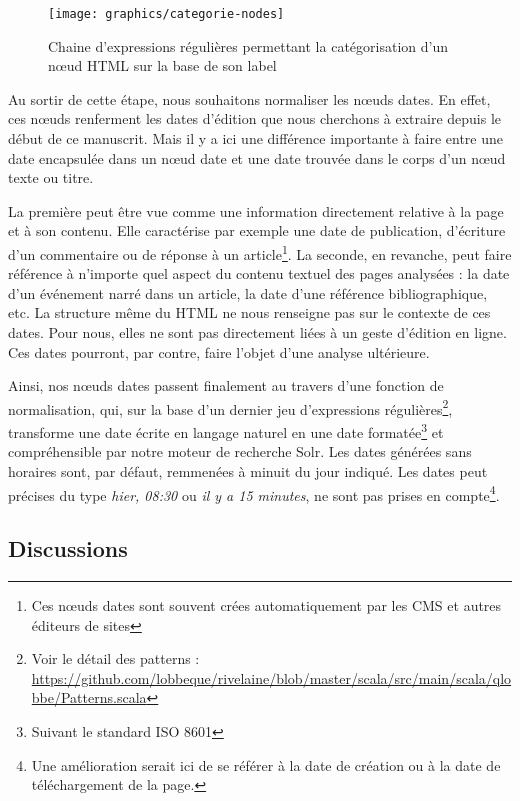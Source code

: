 \documentclass[symmetric,justified,marginals=raggedouter]{tufte-book}
\begin{document}
\begin{figure*}%
  \texttt{[image: graphics/categorie-nodes]}
  \caption{Chaine d'expressions régulières permettant la catégorisation d'un nœud HTML sur la base de son label}
  \label{fig:categorie-nodes}
\end{figure*}

\noindent Au sortir de cette étape, nous souhaitons normaliser les nœuds dates. En effet, ces nœuds renferment les dates d'édition que nous cherchons à extraire depuis le début de ce manuscrit. Mais il y a ici une différence importante à faire entre une date encapsulée dans un nœud date et une date trouvée dans le corps d'un nœud texte ou titre. 

La première peut être vue comme une information directement relative à la page et à son contenu. Elle caractérise par exemple une date de publication, d'écriture d'un commentaire ou de réponse à un article\footnote{\RaggedOuter Ces nœuds dates sont souvent crées automatiquement par les CMS et autres éditeurs de sites}. La seconde, en revanche, peut faire référence à n'importe quel aspect du contenu textuel des pages analysées : la date d'un événement narré dans un article, la date d'une référence bibliographique, etc. La structure même du HTML ne nous renseigne pas sur le contexte de ces dates. Pour nous, elles ne sont pas directement liées à un geste d'édition en ligne. Ces dates pourront, par contre, faire l'objet d'une analyse ultérieure.

Ainsi, nos nœuds dates passent finalement au travers d'une fonction de normalisation, qui, sur la base d'un dernier jeu d'expressions régulières\footnote{\RaggedOuter Voir le détail des patterns : \url{https://github.com/lobbeque/rivelaine/blob/master/scala/src/main/scala/qlobbe/Patterns.scala}}, transforme une date écrite en langage naturel en une date formatée\footnote{\RaggedOuter Suivant le standard ISO 8601} et compréhensible par notre moteur de recherche Solr. Les dates générées sans horaires sont, par défaut, remmenées à minuit du jour indiqué. Les dates peut précises du type \textit{hier, 08:30} ou \textit{il y a 15 minutes}, ne sont pas prises en compte\footnote{\RaggedOuter Une amélioration serait ici de se référer à la date de création ou à la date de téléchargement de la page.}.

\subsection{Discussions}
\end{document}
